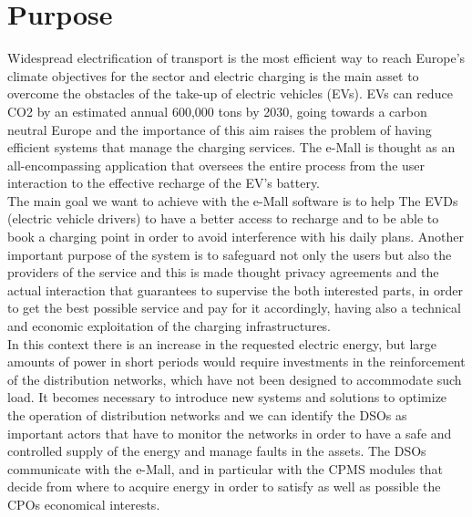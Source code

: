 \section{Purpose}
\label{sec:purpose}%
Widespread electrification of transport is the most efficient way to reach Europe’s climate objectives for the sector and electric charging is the main asset to overcome the obstacles of the take-up of electric vehicles (EVs). EVs can reduce CO2 by an estimated annual 600,000 tons by 2030, going towards a carbon neutral Europe and the importance of this aim raises the problem of having efficient systems that manage the charging services. The e-Mall is thought as an all-encompassing application that oversees the entire process from the user interaction to the effective recharge of the EV's battery.\\

The main goal we want to achieve with the e-Mall software is to help The EVDs (electric vehicle drivers) to have a better access to recharge and to be able to book a charging point in order to avoid interference with his daily plans. Another important purpose of the system is to safeguard not only the users but also the providers of the service and this is made thought privacy agreements and the actual interaction that guarantees to supervise the both interested parts, in order to get the best possible service and pay for it accordingly, having also a technical and economic exploitation of the charging infrastructures. \\

In this context there is an increase in the requested electric energy, but large amounts of power in short periods would require investments in the reinforcement of the distribution networks, which have not been designed to accommodate such load. It becomes necessary to introduce new systems and solutions to optimize the operation of distribution networks and we can identify the DSOs as important actors that have to monitor the networks in order to have a safe and controlled supply of the energy and manage faults in the assets. The DSOs communicate with the e-Mall, and in particular with the CPMS modules that decide from where to acquire energy in order to satisfy as well as possible the CPOs economical interests.



